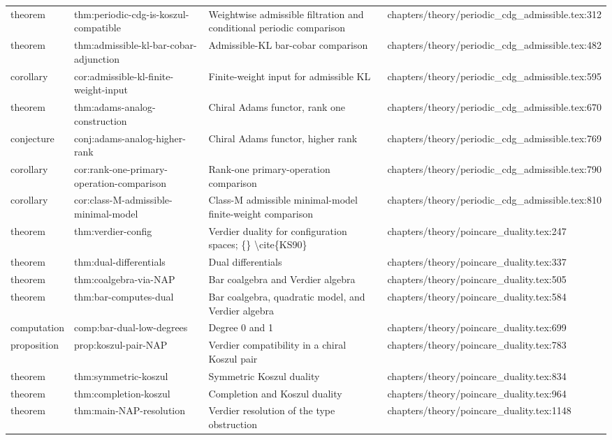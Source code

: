 \documentclass[11pt]{article}
\begin{document}
\begin{longtable}{L{0.10\textwidth}L{0.26\textwidth}L{0.42\textwidth}L{0.22\textwidth}}
theorem & thm:periodic-cdg-is-koszul-compatible & Weightwise admissible filtration and cond{}itional periodic comparison & chapters/theory/periodic\_cdg\_admissible.tex:312\\
theorem & thm:admissible-kl-bar-cobar-adjunction & Admissible-KL bar-cobar comparison & chapters/theory/periodic\_cdg\_admissible.tex:482\\
corollary & cor:admissible-kl-finite-weight-input & Finite-weight input for admissible KL & chapters/theory/periodic\_cdg\_admissible.tex:595\\
theorem & thm:adams-analog-construction & Chiral Adams functor, rank one & chapters/theory/periodic\_cdg\_admissible.tex:670\\
conjecture & conj:adams-analog-higher-rank & Chiral Adams functor, higher rank & chapters/theory/periodic\_cdg\_admissible.tex:769\\
corollary & cor:rank-one-primary-operation-comparison & Rank-one primary-operation comparison & chapters/theory/periodic\_cdg\_admissible.tex:790\\
corollary & cor:class-M-admissible-minimal-model & Class-M admissible minimal-model finite-weight comparison & chapters/theory/periodic\_cdg\_admissible.tex:810\\
theorem & thm:verdier-config & Verdier duality for configuration spaces; \{\} \textbackslash{}cite\{KS90\} & chapters/theory/poincare\_duality.tex:247\\
theorem & thm:dual-differentials & Dual differentials & chapters/theory/poincare\_duality.tex:337\\
theorem & thm:coalgebra-via-NAP & Bar coalgebra and Verdier algebra & chapters/theory/poincare\_duality.tex:505\\
theorem & thm:bar-computes-dual & Bar coalgebra, quadratic model, and Verdier algebra & chapters/theory/poincare\_duality.tex:584\\
computation & comp:bar-dual-low-degrees & Degree 0 and 1 & chapters/theory/poincare\_duality.tex:699\\
proposition & prop:koszul-pair-NAP & Verdier compatibility in a chiral Koszul pair & chapters/theory/poincare\_duality.tex:783\\
theorem & thm:symmetric-koszul & Symmetric Koszul duality & chapters/theory/poincare\_duality.tex:834\\
theorem & thm:completion-koszul & Completion and Koszul duality & chapters/theory/poincare\_duality.tex:964\\
theorem & thm:main-NAP-resolution & Verdier resolution of the type obstruction & chapters/theory/poincare\_duality.tex:1148\\

\end{longtable}
\end{document}
